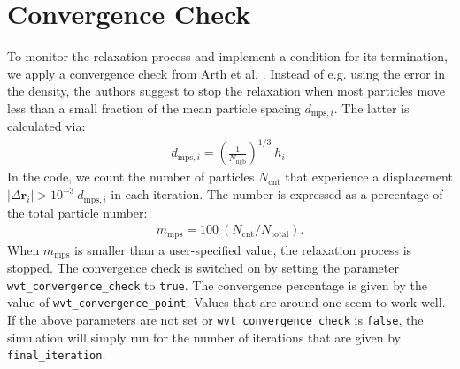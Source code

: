 \documentclass{article}
\begin{document}
\section{Convergence Check}
To monitor the relaxation process and implement a condition for its termination, we apply a convergence check from Arth et al. \cite{Arth19}. 
Instead of e.g. using the error in the density, the authors suggest to stop the relaxation when most particles move less than a small fraction of the mean particle spacing $d_{\mathrm{mps},i}$. 
The latter is calculated via:
\begin{align}
	d_{\mathrm{mps},i} = \left(\frac{1}{N_\mathrm{ngb}}\right)^{1/3} \: h_i. 
\end{align}
In the code, we count the number of particles $N_\mathrm{cnt}$ that experience a displacement $|\Delta \mathbf{r}_i | >  10^{-3} \: d_{\mathrm{mps},i}$ in each iteration. The number is expressed as a percentage of the total particle number: 
\begin{align}
	m_\mathrm{mps} = 100 \: (N_\mathrm{cnt} / N_\mathrm{total}). 
\end{align}
When $m_\mathrm{mps}$ is smaller than a user-specified value, the relaxation process is stopped. 
The convergence check is switched on by setting the parameter \texttt{wvt\_convergence\_check} to \texttt{true}. 
The convergence percentage is given by the value of \texttt{wvt\_convergence\_point}. 
Values that are around one seem to work well. 
If the above parameters are not set or \texttt{wvt\_convergence\_check} is \texttt{false}, the simulation will simply run for the number of iterations that are given by \texttt{final\_iteration}.
\end{document}
